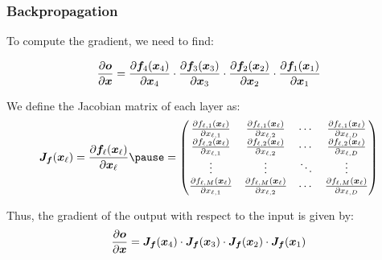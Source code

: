 \documentclass[smaller]{beamer}
\begin{document}
\begin{frame}
  \frametitle{Backpropagation}\pause

  To compute the gradient, we need to find:

  \begin{equation}
    \frac{\partial{\bm o}}{\partial{\bm x}} = \frac{\partial{\bm f_{4}(\bm x_{4})}}{\partial{\bm x_{4}}} \cdot \frac{\partial{\bm f_{3}(\bm x_{3})}}{\partial{\bm x_{3}}} \cdot \frac{\partial{\bm f_{2}(\bm x_{2})}}{\partial{\bm x_{2}}} \cdot \frac{\partial{\bm f_{1}(\bm x_{1})}}{\partial{\bm x_{1}}}
  \end{equation}

  \pause

  We define the Jacobian matrix of each layer as:
  \begin{equation}
    \bm J_{\bm f}(\bm x_{\ell}) = \pd{\bm f_{\ell}(\bm x_{\ell})}{\bm x_{\ell}} \pause
    = 
    \begin{pmatrix}
      \pd{f_{\ell,1}(\bm x_{\ell})}{x_{\ell,1}} & \pd{f_{\ell,1}(\bm x_{\ell})}{x_{\ell,2}} & \cdots & \pd{f_{\ell,1}(\bm x_{\ell})}{x_{\ell,D}} \\
      \pd{f_{\ell,2}(\bm x_{\ell})}{x_{\ell,1}} & \pd{f_{\ell,2}(\bm x_{\ell})}{x_{\ell,2}} & \cdots & \pd{f_{\ell,2}(\bm x_{\ell})}{x_{\ell,D}} \\
      \vdots & \vdots & \ddots & \vdots \\
      \pd{f_{\ell,M}(\bm x_{\ell})}{x_{\ell,1}} & \pd{f_{\ell,M}(\bm x_{\ell})}{x_{\ell,2}} & \cdots & \pd{f_{\ell,M}(\bm x_{\ell})}{x_{\ell,D}}
    \end{pmatrix}
  \end{equation}

  \pause
  Thus, the gradient of the output with respect to the input is given by:\pause
  \begin{equation}
    \frac{\partial{\bm o}}{\partial{\bm x}} = \bm J_{\bm f}(\bm x_{4}) \cdot \bm J_{\bm f}(\bm x_{3}) \cdot \bm J_{\bm f}(\bm x_{2}) \cdot \bm J_{\bm f}(\bm x_{1})
  \end{equation}
\end{frame}
\end{document}
